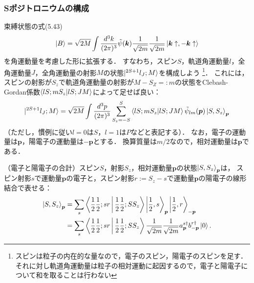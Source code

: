 \subsubsection{Sポジトロニウムの構成}
束縛状態の式(5.43)
\[ \ket{B} = \sqrt{2M} \int \frac{d^3k}{(2\pi)^3} \tilde\psi(\boldsymbol{k}) \frac{1}{\sqrt{2m}} \frac{1}{\sqrt{2m}} \ket{\boldsymbol{k}\uparrow, -\boldsymbol{k}\uparrow} \]
を角運動量を考慮した形に拡張する．
すなわち，スピン$S$，軌道角運動量$l$，全角運動量$J$，全角運動量の射影$M$の状態$\ket{^{2S+1}l_J; M}$を構成しよう
\footnote{スピンは粒子の内在的な量なので，電子のスピン，陽電子のスピンを足す．それに対し軌道角運動量は粒子の相対運動に起因するので，電子と陽電子について和を取ることは行わない}．
これには，スピンの射影が$S_z$で軌道角運動量の射影が$M-S_Z=:m$の状態をClebash-Gordan係数$\braket{lS; mS_z | lS; JM}$によって足せば良い：
\begin{align}
  \ket{^{2S+1}l_J; M} = \sqrt{2M} \int \frac{d^3p}{(2\pi)^3} \sum_{S_z=-S}^S
  \braket{lS; mS_z | lS; JM} \tilde{\psi}_{lm}(\boldsymbol{p}) \ket{S, S_z}_{\boldsymbol{p}}
  \label{prob5_4a_Ps_wf}
\end{align}
（ただし，慣例に従い$l=0$は$S$，$l=1$は$P$などと表記する）．
なお，電子の運動量は$\boldsymbol{p}$，陽電子の運動量は$-\boldsymbol{p}$とする．
換算質量は$m/2$なので，相対運動量は$\boldsymbol{p}$である．

\begin{center}
\end{center}

（電子と陽電子の合計）スピン$S$，射影$S_z$，相対運動量$\boldsymbol{p}$の状態$\ket{S, S_z}_{\boldsymbol{p}}$は，
スピン射影$s$で運動量$\boldsymbol{p}$の電子と，スピン射影$r:=S_z-s$で運動量$\boldsymbol{p}$の陽電子の線形結合で表せる：
\begin{align*}
  \ket{S, S_z}_{\boldsymbol{p}} &= \sum_s \Braket{ \frac{1}{2} \frac{1}{2}; s r | \frac{1}{2} \frac{1}{2}; S S_z} \Ket{\frac{1}{2}, s}_{\boldsymbol{p}} \Ket{\frac{1}{2}, r}_{-\boldsymbol{p}} \\
  &= \sum_s \Braket{ \frac{1}{2} \frac{1}{2}; s r | \frac{1}{2} \frac{1}{2}; S S_z}
  \frac{1}{\sqrt{2m}} \frac{1}{\sqrt{2m}} a_{\boldsymbol{p}}^{s\dagger} b_{-\boldsymbol{p}}^{r\dagger} \ket{0} .
\end{align*}

